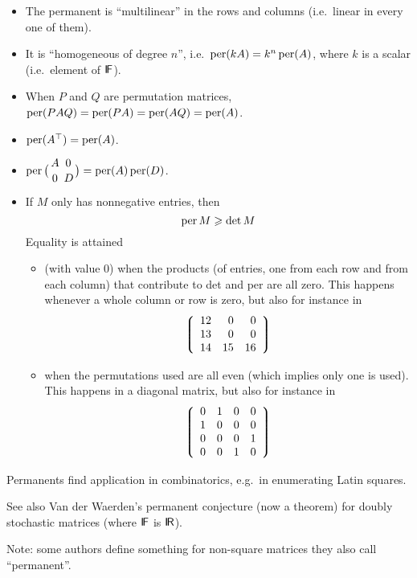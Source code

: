 \documentclass[12pt]{article}
\let\ge\geqslant
\let\D\displaystyle
\let\S\scriptstyle
\let\SS\scriptscriptstyle
\def\sfmath#1{{\mathchoice%
{{\sf #1}}{{\sf #1}}{{\S\sf #1}}{{\SS\sf #1}}}}
\def\Stalkset#1{\sfmath{I\kern-.12em#1}}
\def\Rset{\Stalkset R}
\def\Fset{\Stalkset F}
\begin{document}
\begin{itemize}

\item The permanent is ``multilinear'' in the rows and columns (i.e.\
      linear in every one of them).

\item It is ``homogeneous of degree $n$'', i.e.\ $\mathop{\rm per}\nolimits(kA) = k^n\mathop{\rm per}\nolimits(A)$,
      where $k$ is a scalar (i.e.\ element of $\Fset$).

\item When $P$ and $Q$ are permutation matrices, $\mathop{\rm per}\nolimits(PAQ) = \mathop{\rm per}\nolimits(PA)
      = \mathop{\rm per}\nolimits(AQ) = \mathop{\rm per}\nolimits(A)$.

\item $\mathop{\rm per}\nolimits(A^\top) = \mathop{\rm per}\nolimits(A)$.

\item $\D\per\big({A\;\;0\,\atop\,0\;\;D}\big) = \per(A)\per(D)$.

\item If $M$ only has nonnegative entries, then
      $$
          \per M \ge \det M
      $$
      Equality is attained

      \begin{itemize}

      \item (with value 0) when the products (of entries, one from each row
            and from each column) that contribute to det and per are all zero.
            This happens whenever a whole column or row is zero, but also for
            instance in
            $$
              \left\lgroup
              \begin{array}{rrr}
              12  &  0  &  0  \\
              13  &  0  &  0  \\
              14  & 15  & 16
              \end{array}
              \right\rgroup
            $$

      \item when the permutations used are all even (which implies only
            one is used). This happens in a diagonal matrix, but also
            for instance in
            $$
              \left\lgroup
              \begin{array}{cccc}
               0  &  1  &  0  &  0  \\
               1  &  0  &  0  &  0  \\
               0  &  0  &  0  &  1  \\
               0  &  0  &  1  &  0
              \end{array}
              \right\rgroup
            $$

      \end{itemize}

\end{itemize}

Permanents find application in combinatorics, e.g.\ in enumerating Latin
squares.

See also Van der Waerden's permanent conjecture (now a theorem) for doubly
stochastic matrices (where $\Fset$ is $\Rset$).

Note: some authors define something for non-square matrices they also call ``permanent''.
\end{document}
